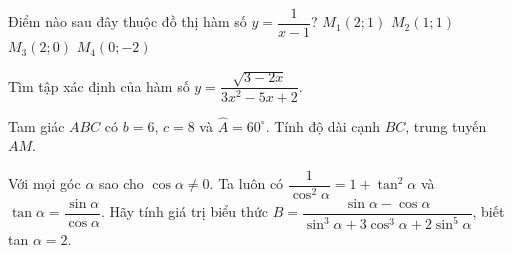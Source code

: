 \begin{ex}%
	Điểm nào sau đây thuộc đồ thị hàm số $y=\dfrac{1}{x-1}$?
	\choice
	{\True $M_1(2;1)$}
	{$M_2(1;1)$}
	{$M_3(2;0)$}
	{$M_4(0;-2)$}
\end{ex}
\begin{bt} 
Tìm tập xác định của hàm số $y=\dfrac{\sqrt{3-2x}}{3x^2-5x+2}$.
\end{bt}
\begin{bt}
	Tam giác $ABC$ có $b= 6$, $c= 8$ và $\widehat{A}=60^\circ$. Tính độ dài cạnh $BC$, trung tuyến $AM$.
	\loigiai{ }
\end{bt}
\begin{bt}%
Với mọi góc $\alpha$ sao cho $\cos \alpha \neq 0$. Ta luôn có $\dfrac{1}{\cos ^{2} \alpha}=1+\tan ^{2} \alpha$ và $\tan \alpha=\dfrac{\sin \alpha}{\cos \alpha}$.
Hãy tính giá trị biểu thức $B=\dfrac{\sin \alpha-\cos \alpha}{\sin ^{3} \alpha+3 \cos ^{3} \alpha+2 \sin ^{5} \alpha}$, biết tan $\alpha=2$.
\end{bt}
